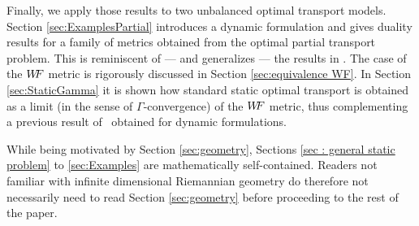 Finally, we apply those results to two unbalanced optimal transport models. 
Section \ref{sec:ExamplesPartial} introduces a dynamic formulation and gives duality results for a family of metrics obtained from the optimal partial transport problem. This is reminiscent of --- and generalizes --- the results in \cite{piccoli2013properties,piccoli2014generalized}.
The case of the $W\! \! F$ metric is rigorously discussed in Section \ref{sec:equivalence WF}. In Section \ref{sec:StaticGamma} it is shown how standard static optimal transport is obtained as a limit (in the sense of $\Gamma$-convergence) of the $W\! \! F$ metric, thus complementing a previous result of~\cite{ChizatOTFR2015} obtained for dynamic formulations. 

While being motivated by Section \ref{sec:geometry}, Sections \ref{sec : general static problem} to \ref{sec:Examples} are mathematically self-contained. Readers not familiar with infinite dimensional Riemannian geometry do therefore not necessarily need to read Section \ref{sec:geometry} before proceeding to the rest of the paper.

